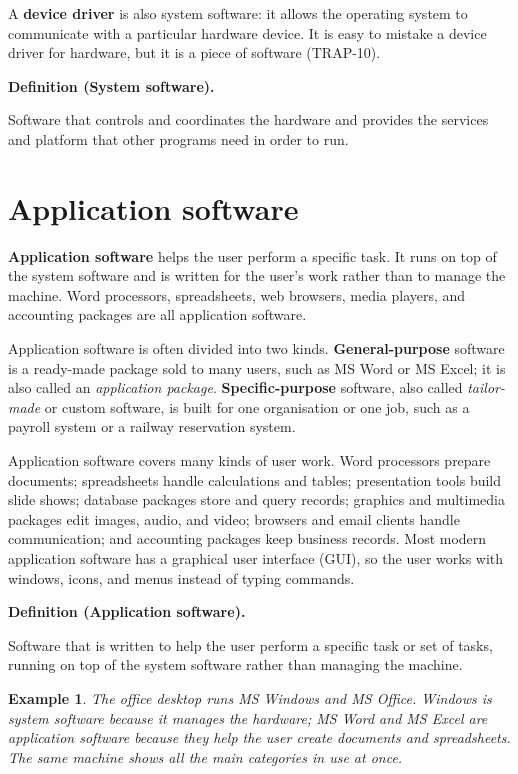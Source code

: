 \documentclass[11pt]{article}
\newtheorem{example}{Example}[section]
\newenvironment{definitionbox}[1]{%
  \par\noindent\textbf{Definition (#1).}\ \itshape
}{\par\vspace{0.3em}}
\begin{document}
A \textbf{device driver} is also system
software: it allows the operating system to communicate with a particular
hardware device. It is easy to mistake a device driver for hardware, but it is
a piece of software (TRAP-10).

\begin{definitionbox}{System software}
Software that controls and coordinates the hardware and provides the services
and platform that other programs need in order to run.
\end{definitionbox}

\section{Application software}
\textbf{Application software} helps the user perform a specific task. It runs
on top of the system software and is written for the user's work rather than
to manage the machine. Word processors, spreadsheets, web browsers, media
players, and accounting packages are all application software.

Application software is often divided into two kinds. \textbf{General-purpose}
software is a ready-made package sold to many users, such as MS Word or MS
Excel; it is also called an \emph{application package}. \textbf{Specific-purpose}
software, also called \emph{tailor-made} or custom software, is built for one
organisation or one job, such as a payroll system or a railway reservation
system.

Application software covers many kinds of user work. Word processors prepare
documents; spreadsheets handle calculations and tables; presentation tools
build slide shows; database packages store and query records; graphics and
multimedia packages edit images, audio, and video; browsers and email clients
handle communication; and accounting packages keep business records. Most
modern application software has a graphical user interface (GUI), so the user
works with windows, icons, and menus instead of typing commands.

\begin{definitionbox}{Application software}
Software that is written to help the user perform a specific task or set of
tasks, running on top of the system software rather than managing the machine.
\end{definitionbox}

\begin{example}
The office desktop runs MS Windows and MS Office. Windows is system software
because it manages the hardware; MS Word and MS Excel are application software
because they help the user create documents and spreadsheets. The same machine
shows all the main categories in use at once.
\end{example}
\end{document}
